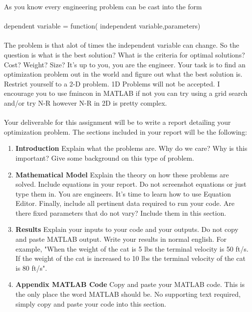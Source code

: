 As you know every engineering problem can be cast into the form  \\
\ \\
dependent variable = function( independent variable,parameters)\\
\ \\
The problem is that alot of times the independent variable can
change. So the question is what is the best solution? What is the
criteria for optimal solutions? Cost? Weight? Size? It's up to you,
you are the engineer. Your task is to find an optimization problem out
in the world and figure out what the best solution is. Restrict
yourself to a 2-D problem. 1D Problems will not be accepted. I
encourage you to use fmincon in MATLAB if not you can try using a grid
search and/or try N-R however N-R in 2D is pretty complex. \\
\ \\
Your deliverable for this assignment will be to write a report
detailing your optimization problem. The sections included in your
report will be the following:
\begin{enumerate}
\item{{\bf Introduction}} 
Explain what the problems are. Why do we care? Why
is this important? Give some background on this type of problem. 
\item{{\bf Mathematical Model}}
Explain the theory on how these problems are
solved. Include equations in your report. Do not screenshot equations
or just type them in. You are engineers. It's time to learn how to use
Equation Editor. Finally, include all pertinent data required to run
your code. Are there fixed parameters that do not vary? Include them
in this section. 
\item{{\bf Results}}
Explain your inputs to your code and your outputs. Do
not copy and paste MATLAB output. Write your results in normal
english. For example, "When the weight of the cat is 5 lbs the
terminal velocity is 50 ft/s. If the weight of the cat is increased to
10 lbs the terminal velocity of the cat is 80 ft/s".  
\item{{\bf Appendix MATLAB Code}}
Copy and paste your MATLAB code. This is
the only place the word MATLAB should be. No supporting text required,
simply copy and paste your code into this section. 
\end{enumerate}
